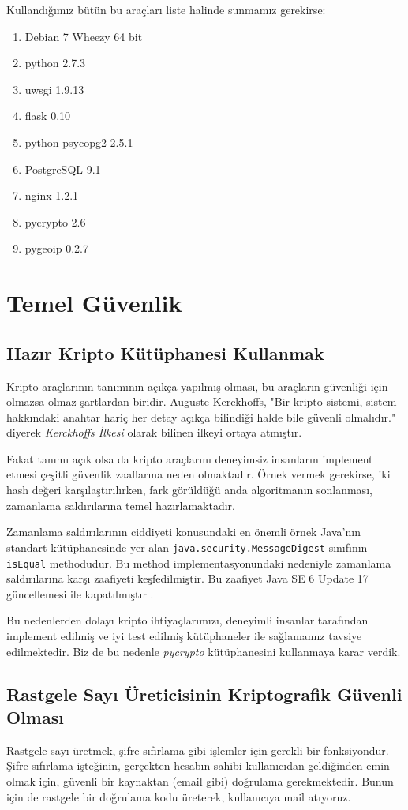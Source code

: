 \documentclass[11pt,a4paper]{report}
\begin{document}
Kullandığımız bütün bu araçları liste halinde sunmamız gerekirse:

\begin{enumerate}
\item Debian 7 Wheezy 64 bit
\item python 2.7.3
\item uwsgi 1.9.13
\item flask 0.10
\item python-psycopg2 2.5.1
\item PostgreSQL 9.1
\item nginx 1.2.1
\item pycrypto 2.6
\item pygeoip 0.2.7
\end{enumerate}


\chapter{Temel Güvenlik}
\section{Hazır Kripto Kütüphanesi Kullanmak}
Kripto araçlarının tanımının açıkça yapılmış olması, bu araçların güvenliği için olmazsa olmaz şartlardan biridir. Auguste Kerckhoffs, "Bir kripto sistemi, sistem hakkındaki anahtar hariç her detay açıkça bilindiği halde bile güvenli olmalıdır."\cite{kerckhoffs} diyerek \emph{Kerckhoffs İlkesi} olarak bilinen ilkeyi ortaya atmıştır.

Fakat tanımı açık olsa da kripto araçlarını deneyimsiz insanların implement etmesi çeşitli güvenlik zaaflarına neden olmaktadır. Örnek vermek gerekirse, iki hash değeri karşılaştırılırken, fark görüldüğü anda algoritmanın sonlanması, zamanlama saldırılarına temel hazırlamaktadır.

Zamanlama saldırılarının ciddiyeti konusundaki en önemli örnek Java'nın standart kütüphanesinde yer alan \texttt{java.security.MessageDigest} sınıfının \texttt{isEqual} methodudur. Bu method implementasyonundaki nedeniyle zamanlama saldırılarına karşı zaafiyeti keşfedilmiştir. Bu zaafiyet Java SE 6 Update 17 güncellemesi ile kapatılmıştır \cite{javavul}.

Bu nedenlerden dolayı kripto ihtiyaçlarımızı, deneyimli insanlar tarafından implement edilmiş ve iyi test edilmiş kütüphaneler ile sağlamamız tavsiye edilmektedir. Biz de bu nedenle \emph{pycrypto} kütüphanesini kullanmaya karar verdik.

\section{Rastgele Sayı Üreticisinin Kriptografik Güvenli Olması}
Rastgele sayı üretmek, şifre sıfırlama gibi işlemler için gerekli bir fonksiyondur. Şifre sıfırlama işteğinin, gerçekten hesabın sahibi kullanıcıdan geldiğinden emin olmak için, güvenli bir kaynaktan (email gibi) doğrulama gerekmektedir. Bunun için de rastgele bir doğrulama kodu üreterek, kullanıcıya mail atıyoruz.
\end{document}

